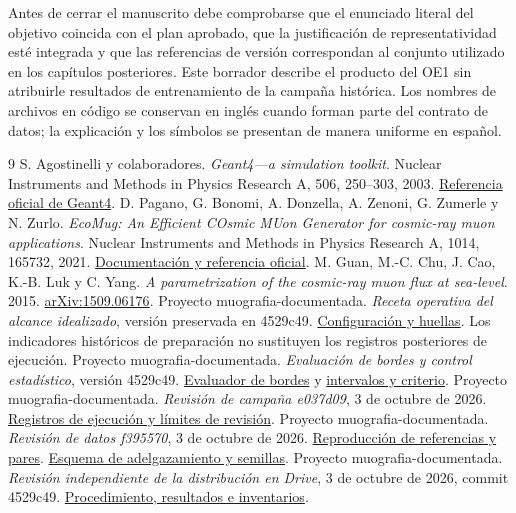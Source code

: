 \documentclass[11pt,a4paper]{article}
\begin{document}
Antes de cerrar el manuscrito debe comprobarse que el enunciado literal del objetivo coincida con el plan aprobado, que la justificación de representatividad esté integrada y que las referencias de versión correspondan al conjunto utilizado en los capítulos posteriores. Este borrador describe el producto del OE1 sin atribuirle resultados de entrenamiento de la campaña histórica. Los nombres de archivos en código se conservan en inglés cuando forman parte del contrato de datos; la explicación y los símbolos se presentan de manera uniforme en español.

\begin{thebibliography}{9}
 S. Agostinelli y colaboradores. \emph{Geant4---a simulation toolkit}. Nuclear Instruments and Methods in Physics Research A, 506, 250--303, 2003. \href{https://geant4.web.cern.ch/about/publications.html}{Referencia oficial de Geant4}.
 D. Pagano, G. Bonomi, A. Donzella, A. Zenoni, G. Zumerle y N. Zurlo. \emph{EcoMug: An Efficient COsmic MUon Generator for cosmic-ray muon applications}. Nuclear Instruments and Methods in Physics Research A, 1014, 165732, 2021. \href{https://dr4kan.github.io/EcoMug/index.html}{Documentación y referencia oficial}.
 M. Guan, M.-C. Chu, J. Cao, K.-B. Luk y C. Yang. \emph{A parametrization of the cosmic-ray muon flux at sea-level}. 2015. \href{https://arxiv.org/abs/1509.06176}{arXiv:1509.06176}.
 Proyecto muografia-documentada. \emph{Receta operativa del alcance idealizado}, versión preservada en 4529c49. \href{https://github.com/anlegogo/muografia-documentada/blob/4529c49/objetivo-1/contratos/receta-operativa-siete-actividades.json}{Configuración y huellas}. Los indicadores históricos de preparación no sustituyen los registros posteriores de ejecución.
 Proyecto muografia-documentada. \emph{Evaluación de bordes y control estadístico}, versión 4529c49. \href{https://github.com/anlegogo/muografia-documentada/blob/4529c49/herramientas/evaluar_bordes_angular.py}{Evaluador de bordes} y \href{https://github.com/anlegogo/muografia-documentada/blob/4529c49/herramientas/estadistica_control_angular.py}{intervalos y criterio}.
 Proyecto muografia-documentada. \emph{Revisión de campaña e037d09}, 3 de octubre de 2026. \href{https://github.com/anlegogo/muografia-documentada/blob/4529c49/objetivo-1/REVISION_CAMPANA_E037D09.md}{Registros de ejecución y límites de revisión}.
 Proyecto muografia-documentada. \emph{Revisión de datos f395570}, 3 de octubre de 2026. \href{https://github.com/anlegogo/muografia-documentada/blob/4529c49/objetivo-1/REVISION_DATOS_F395570.md}{Reproducción de referencias y pares}. \href{https://github.com/anlegogo/muografia-documentada/blob/4529c49/herramientas/empaquetar_angular_v1.py}{Esquema de adelgazamiento y semillas}.
 Proyecto muografia-documentada. \emph{Revisión independiente de la distribución en Drive}, 3 de octubre de 2026, commit 4529c49. \href{https://github.com/anlegogo/muografia-documentada/blob/4529c49/objetivo-1/REVISION_DISTRIBUCION_DRIVE.md}{Procedimiento, resultados e inventarios}.
\end{thebibliography}
\end{document}
